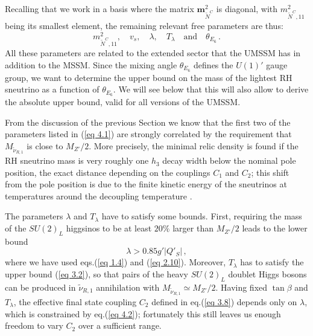 \documentclass[a4paper,11pt]{article}
\begin{document}
Recalling that we work in a basis where the matrix
${\mathbf m}^2_{\tilde N^C}$ is diagonal, with $m^2_{\tilde N^C,11}$
being its smallest element, the remaining relevant free parameters are
thus:
%
\begin{equation} \label{eq 4.1}
m^2_{\tilde{N}^C, 11}, \quad v_s, \quad  \lambda, \quad T_\lambda \quad \text{and} 
\quad  \theta_{E_6}\,.
\end{equation}
%
All these parameters are related to the extended sector that the UMSSM
has in addition to the MSSM. Since the mixing angle $\theta_{E_6}$
defines the $U(1)'$ gauge group, we want to determine the upper bound
on the mass of the lightest RH sneutrino as a function of
$\theta_{E_6}$. We will see below that this will also allow to derive
the absolute upper bound, valid for all versions of the UMSSM.

From the discussion of the previous Section we know that the first two
of the parameters listed in (\ref{eq 4.1}) are strongly correlated by
the requirement that $M_{\tilde \nu_{R,1}}$ is close to
$M_{Z'}/2$. More precisely, the minimal relic density is found if the
RH sneutrino mass is very roughly one $h_3$ decay width below the
nominal pole position, the exact distance depending on the couplings
$C_1$ and $C_2$; this shift from the pole position is due to the
finite kinetic energy of the sneutrinos at temperatures around the
decoupling temperature \cite{Griest:1990kh}.

The parameters $\lambda$ and $T_\lambda$ have to satisfy some bounds. First,
requiring the mass of the $SU(2)_{L}$ higgsinos to be at least $20\%$ larger
than $M_{Z'}/2$ leads to the lower bound
%
\begin{equation} \label{eq 4.2}
\lambda > 0.85  g' |Q'_S| \,,
\end{equation}
%
where we have used eqs.(\ref{eq 1.4}) and (\ref{eq 2.10}). Moreover,
$T_\lambda$ has to satisfy the upper bound (\ref{eq 3.2}), so that pairs of
the heavy $SU(2)_{L}$ doublet Higgs bosons can be produced in $\tilde \nu_{R,1}$
annihilation with $M_{\tilde \nu_{R,1}} \simeq M_{Z'}/2$. Having fixed $\tan\beta$ and $T_\lambda$, the effective final state
coupling $C_2$ defined in eq.(\ref{eq 3.8}) depends only on $\lambda$,
which is constrained by eq.(\ref{eq 4.2}); fortunately this still leaves
us enough freedom to vary $C_2$ over a sufficient range.
\end{document}

